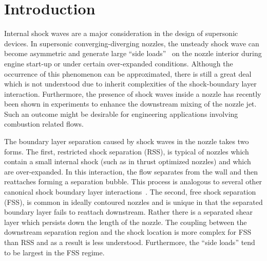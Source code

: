 \documentclass[]{aiaa-tc}%
\begin{document}
 
 

\section{Introduction}


Internal shock waves are a major consideration in the design of supersonic devices.  In supersonic converging-diverging nozzles, the unsteady shock wave can become asymmetric and generate large ``side loads''~\cite{Ostlund:05} on the nozzle interior during engine start-up or under certain over-expanded conditions.  Although the occurrence of this phenomenon can be approximated, there is still a great deal which is not understood due to inherit complexities of the shock-boundary layer interaction.  Furthermore, the presence of shock waves inside a nozzle has recently been shown in experiments \cite{Papam:10} to enhance the downstream mixing of the nozzle jet.  Such an outcome might be desirable for engineering applications involving combustion related flows. 


The boundary layer separation caused by shock waves in the nozzle takes two forms.  The first, restricted shock separation (RSS), is typical of nozzles which contain a small internal shock (such as in thrust optimized nozzles) and which are over-expanded.  In this interaction, the flow separates from the wall and then reattaches forming a separation bubble.  This process is analogous to several other canonical shock boundary layer interactions~\cite{Dussauge:09,Bookey:05}.  The second, free shock separation (FSS), is common in ideally contoured nozzles and is unique in that the separated boundary layer fails to reattach downstream.  Rather there is a separated shear layer which persists down the length of the nozzle.  The coupling between the downstream separation region and the shock location is more complex for FSS than RSS and as a result is less understood\cite{Ostlund:05}.  Furthermore, the ``side loads'' tend to be largest in the FSS regime.
\end{document}
